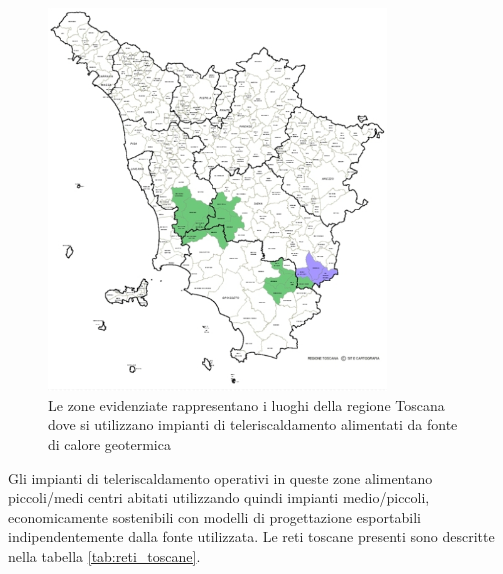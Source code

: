 \documentclass[laurea,oneside,11pt]{USiena_tesiLM}
\begin{document}
\begin{figure}[!ht]
\centering
\includegraphics[width=0.8\textwidth]{figure/toscana}
\caption{Le zone evidenziate rappresentano i luoghi della regione Toscana dove si utilizzano impianti di teleriscaldamento alimentati da fonte di calore geotermica}
\label{fig:toscana}
\end{figure}

Gli impianti di teleriscaldamento operativi in queste zone alimentano  piccoli/medi centri abitati utilizzando quindi impianti medio/piccoli, economicamente sostenibili con modelli di progettazione esportabili indipendentemente dalla fonte utilizzata. Le reti toscane presenti sono descritte nella tabella \ref{tab:reti_toscane}.
\end{document}
